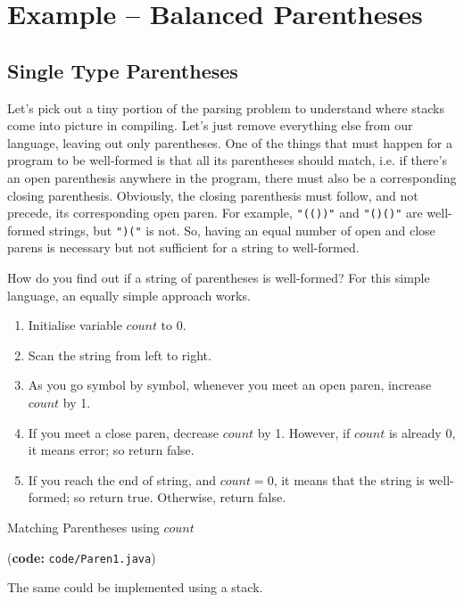 \documentclass[12pt,a4paper]{article}
\begin{document}
\section{Example -- Balanced Parentheses}

\subsection{Single Type Parentheses}
Let's pick out a tiny portion of the parsing problem to understand where stacks come into picture in compiling. Let's just remove everything else from our language, leaving out only parentheses. One of the things that must happen for a program to be well-formed is that all its parentheses should match, i.e. if there's an open parenthesis anywhere in the program, there must also be a corresponding closing parenthesis. Obviously, the closing parenthesis must follow, and not precede, its corresponding open paren. For example, \texttt{"(())"} and \texttt{"()()"} are well-formed strings, but \texttt{")("} is not. So, having an equal number of open and close parens is necessary but not sufficient for a string to well-formed.

How do you find out if a string of parentheses is well-formed? For this simple language, an equally simple approach works.
\begin{algorithm}
\begin{enumerate}
\item Initialise variable $count$ to 0.
\item Scan the string from left to right.
\item As you go symbol by symbol, whenever you meet an open paren, increase $count$ by 1.
\item If you meet a close paren, decrease $count$ by 1. However, if $count$ is already 0, it means error; so return false.
\item If you reach the end of string, and $count = 0$, it means that the string is well-formed; so return true. Otherwise, return false. 
\end{enumerate}
\caption{Matching Parentheses using $count$}
\label{a:mp1}
\end{algorithm}

(\textbf{code:} \texttt{code/Paren1.java})

The same could be implemented using a stack. 
\end{document}
